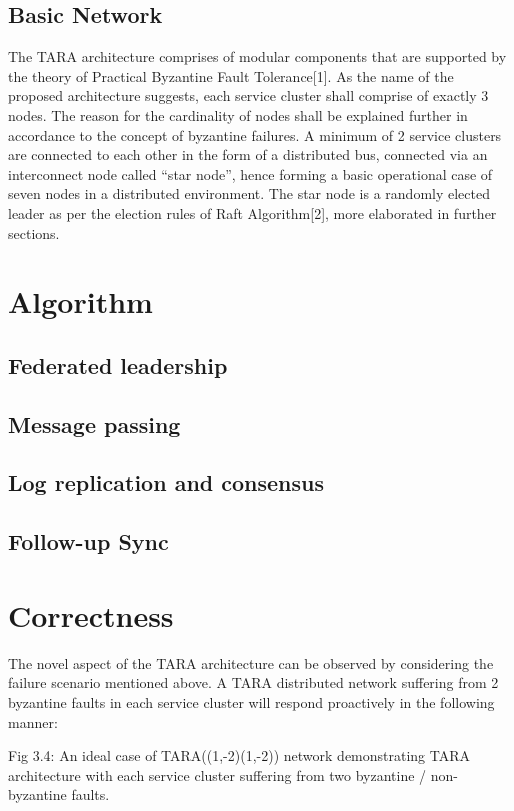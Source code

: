\documentclass[]{article}
\begin{document}
\subsection{Basic Network}
The TARA architecture comprises of modular components that are supported by the theory of Practical Byzantine Fault Tolerance[1]. As the name of the proposed architecture suggests, each service cluster shall comprise of exactly 3 nodes. The reason for the cardinality of nodes shall be explained further in accordance to the concept of byzantine failures. A minimum of 2 service clusters are connected to each other in the form of a distributed bus, connected via an interconnect node called “star node”, hence forming a basic operational case of seven nodes in a distributed environment. The star node is a randomly elected leader as per the election rules of Raft Algorithm[2], more elaborated in further sections.

\section{Algorithm}
\subsection{Federated leadership}
\subsection{Message passing}
\subsection{Log replication and consensus}
\subsection{Follow-up Sync}

\section{Correctness}
The novel aspect of the TARA architecture can be observed by considering the failure scenario mentioned above. A TARA distributed network suffering from 2 byzantine faults in each service cluster will respond proactively in the following manner:


Fig 3.4: An ideal case of TARA((1,-2)(1,-2)) network demonstrating TARA architecture with each service cluster suffering from two byzantine / non-byzantine faults.
\end{document}
